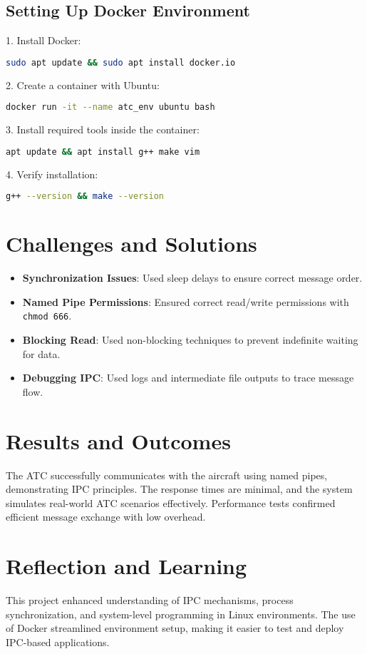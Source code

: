 \documentclass[12pt, onecolumn]{IEEEtran}
\begin{document}
\subsection{Setting Up Docker Environment}
1. Install Docker:
\begin{lstlisting}[language=bash]
sudo apt update && sudo apt install docker.io
\end{lstlisting}

2. Create a container with Ubuntu:
\begin{lstlisting}[language=bash]
docker run -it --name atc_env ubuntu bash
\end{lstlisting}

3. Install required tools inside the container:
\begin{lstlisting}[language=bash]
apt update && apt install g++ make vim
\end{lstlisting}

4. Verify installation:
\begin{lstlisting}[language=bash]
g++ --version && make --version
\end{lstlisting}

\section{Challenges and Solutions}
\begin{itemize}
    \item \textbf{Synchronization Issues}: Used sleep delays to ensure correct message order.
    \item \textbf{Named Pipe Permissions}: Ensured correct read/write permissions with \texttt{chmod 666}.
    \item \textbf{Blocking Read}: Used non-blocking techniques to prevent indefinite waiting for data.
    \item \textbf{Debugging IPC}: Used logs and intermediate file outputs to trace message flow.
\end{itemize}

\section{Results and Outcomes}
The ATC successfully communicates with the aircraft using named pipes, demonstrating IPC principles. The response times are minimal, and the system simulates real-world ATC scenarios effectively. Performance tests confirmed efficient message exchange with low overhead.

\section{Reflection and Learning}
This project enhanced understanding of IPC mechanisms, process synchronization, and system-level programming in Linux environments. The use of Docker streamlined environment setup, making it easier to test and deploy IPC-based applications.
\end{document}

